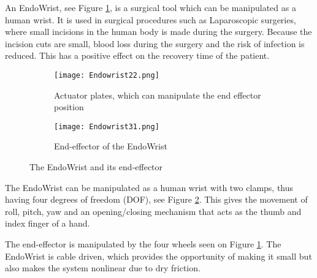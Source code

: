 {\color{red}An EndoWrist, see Figure \ref{fig:Endo_plates}, is a surgical tool which can be manipulated as a human wrist.
It is used in surgical procedures such as Laparoscopic surgeries,  where small incisions in the human body is made during the surgery.
Because the incision cuts are small, blood loss during the surgery and the risk of infection is reduced. This has a positive effect on the recovery time of the patient\cite{RIGSP}.


\begin{figure}[h]
  \centering
  \begin{subfigure}{.22\textwidth}
    \centering
    \texttt{[image: Endowrist22.png]}
    \caption{Actuator plates, which can manipulate the end effector position}
    \label{fig:Endo_plates}
  \end{subfigure}
  \begin{subfigure}{.22\textwidth}
    \centering
    \texttt{[image: Endowrist31.png]}
    \caption{End-effector of the EndoWrist\newline}
    \label{fig:Endo_end}
  \end{subfigure}
\caption{The EndoWrist and its end-effector}
\label{fig:endowrits_set}
\end{figure}


The EndoWrist can be manipulated as a human wrist with two clamps, thus having four degrees of freedom (DOF), see Figure \ref{fig:Endo_end}. This gives the movement of roll, pitch, yaw and an opening/closing mechanism that acts as the thumb and index finger of a hand.


The end-effector is manipulated by the four wheels seen on Figure \ref{fig:Endo_plates}. The EndoWrist is cable driven, which provides the opportunity of making it small but also makes the system nonlinear due to dry friction.}




